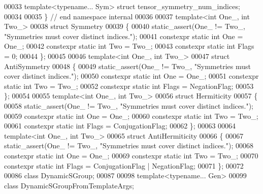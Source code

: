 \begin{DoxyCode}
00033 \textcolor{keyword}{template}<\textcolor{keyword}{typename}... Sym> \textcolor{keyword}{struct }tensor\_symmetry\_num\_indices;
00034 
00035 \} \textcolor{comment}{// end namespace internal}
00036 
00037 \textcolor{keyword}{template}<\textcolor{keywordtype}{int} One\_, \textcolor{keywordtype}{int} Two\_>
00038 \textcolor{keyword}{struct }Symmetry
00039 \{
00040   static\_assert(One\_ != Two\_, \textcolor{stringliteral}{"Symmetries must cover distinct indices."});
00041   constexpr \textcolor{keyword}{static} \textcolor{keywordtype}{int} One = One\_;
00042   constexpr \textcolor{keyword}{static} \textcolor{keywordtype}{int} Two = Two\_;
00043   constexpr \textcolor{keyword}{static} \textcolor{keywordtype}{int} Flags = 0;
00044 \};
00045 
00046 \textcolor{keyword}{template}<\textcolor{keywordtype}{int} One\_, \textcolor{keywordtype}{int} Two\_>
00047 \textcolor{keyword}{struct }AntiSymmetry
00048 \{
00049   static\_assert(One\_ != Two\_, \textcolor{stringliteral}{"Symmetries must cover distinct indices."});
00050   constexpr \textcolor{keyword}{static} \textcolor{keywordtype}{int} One = One\_;
00051   constexpr \textcolor{keyword}{static} \textcolor{keywordtype}{int} Two = Two\_;
00052   constexpr \textcolor{keyword}{static} \textcolor{keywordtype}{int} Flags = NegationFlag;
00053 \};
00054 
00055 \textcolor{keyword}{template}<\textcolor{keywordtype}{int} One\_, \textcolor{keywordtype}{int} Two\_>
00056 \textcolor{keyword}{struct }Hermiticity
00057 \{
00058   static\_assert(One\_ != Two\_, \textcolor{stringliteral}{"Symmetries must cover distinct indices."});
00059   constexpr \textcolor{keyword}{static} \textcolor{keywordtype}{int} One = One\_;
00060   constexpr \textcolor{keyword}{static} \textcolor{keywordtype}{int} Two = Two\_;
00061   constexpr \textcolor{keyword}{static} \textcolor{keywordtype}{int} Flags = ConjugationFlag;
00062 \};
00063 
00064 \textcolor{keyword}{template}<\textcolor{keywordtype}{int} One\_, \textcolor{keywordtype}{int} Two\_>
00065 \textcolor{keyword}{struct }AntiHermiticity
00066 \{
00067   static\_assert(One\_ != Two\_, \textcolor{stringliteral}{"Symmetries must cover distinct indices."});
00068   constexpr \textcolor{keyword}{static} \textcolor{keywordtype}{int} One = One\_;
00069   constexpr \textcolor{keyword}{static} \textcolor{keywordtype}{int} Two = Two\_;
00070   constexpr \textcolor{keyword}{static} \textcolor{keywordtype}{int} Flags = ConjugationFlag | NegationFlag;
00071 \};
00072 
00086 \textcolor{keyword}{class }DynamicSGroup;
00087 
00098 \textcolor{keyword}{template}<\textcolor{keyword}{typename}... Gen>
00099 \textcolor{keyword}{class }DynamicSGroupFromTemplateArgs;

\end{DoxyCode}
